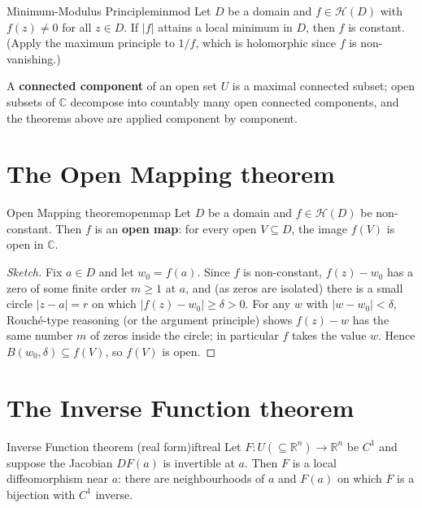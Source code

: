 \documentclass[11pt,openany]{report}
\newcommand{\C}{\mathbb{C}}
\newcommand{\R}{\mathbb{R}}
\newcommand{\abs}[1]{\left\lvert #1 \right\rvert}
\newcommand{\Hol}{\mathcal{H}}
\begin{document}
\begin{theorem}{Minimum-Modulus Principle}{minmod}
Let $D$ be a domain and $f\in\Hol(D)$ with $f(z)\ne0$ for all $z\in D$. If $\abs f$ attains
a local minimum in $D$, then $f$ is constant. (Apply the maximum principle to $1/f$, which
is holomorphic since $f$ is non-vanishing.)
\end{theorem}

\begin{remark}
A \textbf{connected component} of an open set $U$ is a maximal connected subset; open
subsets of $\C$ decompose into countably many open connected components, and the theorems
above are applied component by component.
\end{remark}

\section{The Open Mapping theorem}

\begin{theorem}{Open Mapping theorem}{openmap}
Let $D$ be a domain and $f\in\Hol(D)$ be non-constant. Then $f$ is an \textbf{open map}:
for every open $V\subseteq D$, the image $f(V)$ is open in $\C$.
\end{theorem}

\begin{proof}[Sketch]
Fix $a\in D$ and let $w_0=f(a)$. Since $f$ is non-constant, $f(z)-w_0$ has a zero of some
finite order $m\ge1$ at $a$, and (as zeros are isolated) there is a small circle
$\abs{z-a}=r$ on which $\abs{f(z)-w_0}\ge\delta>0$. For any $w$ with $\abs{w-w_0}<\delta$,
Rouché-type reasoning (or the argument principle) shows $f(z)-w$ has the same number $m$ of
zeros inside the circle; in particular $f$ takes the value $w$. Hence $B(w_0,\delta)\subseteq
f(V)$, so $f(V)$ is open.
\end{proof}

\section{The Inverse Function theorem}

\begin{theorem}{Inverse Function theorem (real form)}{iftreal}
Let $F:U(\subseteq\R^n)\to\R^n$ be $C^1$ and suppose the Jacobian $DF(a)$ is invertible at
$a$. Then $F$ is a local diffeomorphism near $a$: there are neighbourhoods of $a$ and
$F(a)$ on which $F$ is a bijection with $C^1$ inverse.
\end{theorem}
\end{document}
